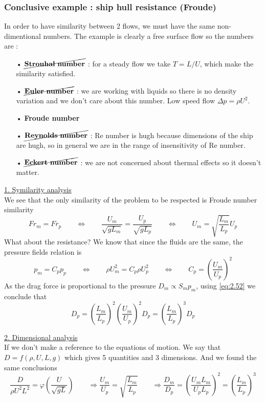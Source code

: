 	\subsubsection{Conclusive example : ship hull resistance (Froude)}
		In order to have similarity between 2 flows, we must have the same non-dimentional numbers. The example is clearly a free surface flow so the numbers are :
		\begin{itemize}
			\item[•] $\cancel{\mathbf{Strouhal\ number}}$ : for a steady flow we take $T = L/U$, which make the similarity satisfied. 
			\item[•] $\cancel{\mathbf{Euler\ number}}$ : we are working with liquids so there is no density variation and we don't care about this number. Low speed flow $\Delta p = \rho U^2$.
			\item[•] \textbf{Froude number}
			\item[•] $\cancel{\mathbf{Reynolds \ number}}$ : Re number is hugh because dimensions of the ship are hugh, so in general we are in the range of insensitivity of Re number. 
			\item[•] $\cancel{\mathbf{Eckert \ number}}$ : we are not concerned about thermal effects so it doesn't matter. \\
		\end{itemize}		 
		
		\underline{1. Symilarity analysis}\\
		
		We see that the only similarity of the problem to be respected is Froude number similarity 
		\begin{equation}
			Fr _m = Fr_p \qquad \Leftrightarrow \qquad \frac{U_m}{\sqrt{gL_m}} = \frac{U_p}{\sqrt{gL_p}} \qquad \Leftrightarrow \qquad U_m = \sqrt{\frac{L_m}{L_p}}U_p
			\label{eq:2.52}
		\end{equation}
		What about the resistance? We know that since the fluids are the same, the pressure fields relation is 
		\begin{equation}
			p_m = C_p p_p \qquad \Leftrightarrow \qquad\rho  U^2_m = C_p \rho  U^2_p \qquad\Leftrightarrow \qquad C_p = \left(\frac{U_m}{U_p}\right)^2
		\end{equation}
		As the drag force is proportional to the pressure $D_m \propto S_mp_m$, using \eqref{eq:2.52} we conclude that
		\begin{equation}
			D_p = \left(\frac{L_m}{L_p} \right)^2\left(\frac{U_m}{U_p} \right)^2D_p = \left(\frac{L_m}{L_p} \right)^3 D_p
		\end{equation}
	
		\underline{2. Dimensional analysis}\\
		
		If we don't make a reference to the equations of motion. We say that $D = f(\rho, U, L, g)$ which gives 5 quantities and 3 dimensions. And we found the same conclusions 
		\begin{equation}
			\frac{D}{\rho U^2 L^2} = \varphi \left( \frac{U}{\sqrt{gL}} \right) \qquad \Rightarrow  \frac{U_m}{U_p} = \sqrt{\frac{L_m}{L_p}} \qquad \Rightarrow  \frac{D_m}{D_p} = \left( \frac{U_m L_m}{U_pL_p} \right)^2 = \left(\frac{L_m}{L_p}\right)^3
		\end{equation}